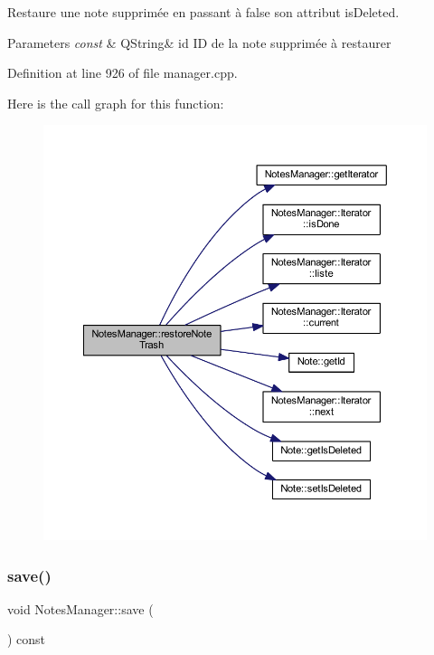 Restaure une note supprimée en passant à false son attribut is\+Deleted. 


\begin{DoxyParams}{Parameters}
{\em const} & Q\+String\& id ID de la note supprimée à restaurer \\
\hline
\end{DoxyParams}


Definition at line 926 of file manager.\+cpp.

Here is the call graph for this function\+:
\nopagebreak
\begin{figure}[H]
\begin{center}
\leavevmode
\includegraphics[width=350pt]{class_notes_manager_abc6587a5d3986ae674e5dd4b9044f348_cgraph}
\end{center}
\end{figure}
\mbox{\label{class_notes_manager_ad271bd7f8079b01b04a32b886b498bac}} 
\subsubsection{\texorpdfstring{save()}{save()}}
{\footnotesize\ttfamily void Notes\+Manager\+::save (\begin{DoxyParamCaption}{ }\end{DoxyParamCaption}) const}



